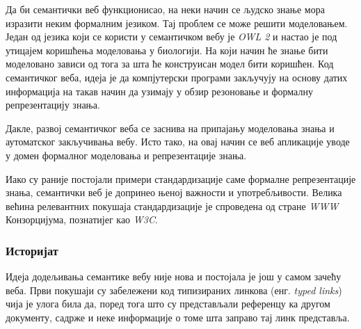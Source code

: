 \documentclass[12pt,oneside]{memoir}
\begin{document}

Да би семантички веб функционисао, на неки начин се људско знање мора изразити неким формалним језиком. Тај проблем се може решити моделовањем. Један од језика који се користи у семантичком вебу је \textit{OWL 2} и настао је под утицајем коришћења моделовања у биологији. На који начин ће знање бити моделовано зависи од тога за шта ће конструисан модел бити коришћен. Код семантичког веба, идеја је да компјутерски програми закључују на основу датих информација на такав начин да узимају у обзир резоновање и формалну репрезентацију знања. \cite{semantic}

Дакле, развој семантичког веба се заснива на припајању моделовања знања и аутоматског закључивања вебу. Исто тако, на овај начин се веб апликације уводе у домен формалног моделовања и репрезентације знања. 

Иако су раније постојали примери стандардизације саме формалне репрезентације знања, семантички веб је допринео њеној важности и употребљивости. Велика већина релевантних покушаја стандардизације је спроведена од стране \textit{WWW} Конзорцијума, познатијег као \textit{W3C}. \cite{semantic}


\subsubsection{Историјат}
\label{subsubsec:semantic_timeline}

Идеја додељивања семантике вебу није нова и постојала је још у самом зачећу веба. Први покушаји су забележени код типизираних линкова (енг. \textit{typed links}) чија је улога била да, поред тога што су представљали референцу ка другом документу, садрже и неке информације о томе шта заправо тај линк представља. \cite{semantic}
\end{document}
